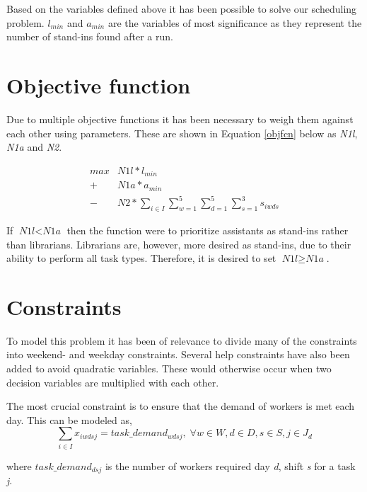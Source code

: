 
Based on the variables defined above it has been possible to solve our scheduling problem. \textit{$l_{min}$} and \textit{$a_{min}$} are the variables of most significance as they represent the number of stand-ins found after a run. 

\section{Objective function}
Due to multiple objective functions it has been necessary to weigh them against each other using parameters. These are shown in Equation \ref{objfcn} below as \textit{N1l}, \textit{N1a} and \textit{N2}.

\begin{equation} \label{objfcn}
\begin{split}
max &N1l*l_{min}\\
 + &N1a*a_{min} \\
 - &N2*\sum_{i \in I}\sum_{w = 1}^{5}\sum_{d = 1}^{5}\sum_{s = 1}^{3} s_{iwds}
\end{split}
\end{equation}

If $\textit{N1l} < \textit{N1a}$ then the function were to prioritize assistants as stand-ins rather than librarians. Librarians are, however, more desired as stand-ins, due to their ability to perform all task types. Therefore, it is desired to set $\textit{N1l} \geq \textit{N1a}$.

\section{Constraints} \label{constraints}
To model this problem it has been of relevance to divide many of the constraints into weekend- and weekday constraints. Several help constraints have also been added to avoid quadratic variables. These would otherwise occur when two decision variables are multiplied with each other.

The most crucial constraint is to ensure that the demand of workers is met each day. This can be modeled as,
\begin{equation}
\sum_{i \in I} x_{iwdsj} = task\_demand_{wdsj}, \; \forall w\in W,d\in D,s\in S,j\in J_d
\end{equation}

where $task\_demand_{dsj}$ is the number of workers required day \textit{d}, shift \textit{s} for a task \textit{j}.


